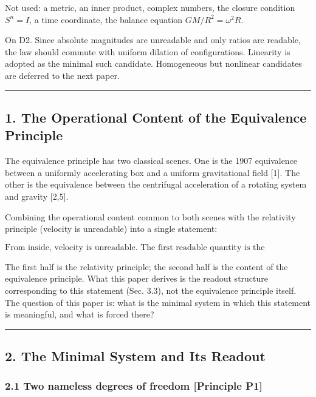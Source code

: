 \documentclass[
  a4paper,
]{article}
\begin{document}
Not used: a metric, an inner product, complex numbers, the closure
condition \(S^n=I\), a time coordinate, the balance equation
\(GM/R^2=\omega^2R\).

On D2. Since absolute magnitudes are unreadable and only ratios are
readable, the law should commute with uniform dilation of
configurations. Linearity is adopted as the minimal such candidate.
Homogeneous but nonlinear candidates are deferred to the next paper.

\begin{center}\rule{0.5\linewidth}{0.5pt}\end{center}

\subsection{1. The Operational Content of the Equivalence
Principle}\label{the-operational-content-of-the-equivalence-principle}

The equivalence principle has two classical scenes. One is the 1907
equivalence between a uniformly accelerating box and a uniform
gravitational field {[}1{]}. The other is the equivalence between the
centrifugal acceleration of a rotating system and gravity {[}2,5{]}.

Combining the operational content common to both scenes with the
relativity principle (velocity is unreadable) into a single statement:

\[
\boxed{\text{From inside, velocity is unreadable. The first readable quantity is the acceleration, and its origin (inertia or gravity) is unreadable.}}
\]

The first half is the relativity principle; the second half is the
content of the equivalence principle. What this paper derives is the
readout structure corresponding to this statement (Sec. 3.3), not the
equivalence principle itself. The question of this paper is: what is the
minimal system in which this statement is meaningful, and what is forced
there?

\begin{center}\rule{0.5\linewidth}{0.5pt}\end{center}

\subsection{2. The Minimal System and Its
Readout}\label{the-minimal-system-and-its-readout}

\subsubsection{2.1 Two nameless degrees of freedom {[}Principle
P1{]}}\label{two-nameless-degrees-of-freedom-principle-p1}
\end{document}
